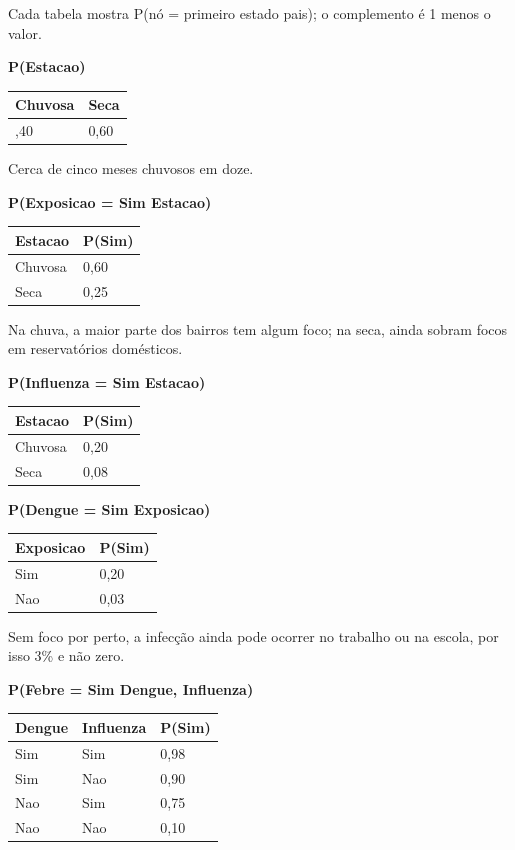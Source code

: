 \documentclass[12pt, a4paper]{article}
\begin{document}
Cada tabela mostra P(nó = primeiro estado \textbar{} pais); o complemento é 1 menos o valor.

\textbf{P(Estacao)}

\begin{longtable}{@{}ll@{}}
\toprule\noalign{}
Chuvosa & Seca \\
\midrule\noalign{}
\endhead
\bottomrule\noalign{}
\endlastfoot
0,40 & 0,60 \\
\end{longtable}

Cerca de cinco meses chuvosos em doze.

\textbf{P(Exposicao = Sim \textbar{} Estacao)}

\begin{longtable}{@{}ll@{}}
\toprule\noalign{}
Estacao & P(Sim\allowbreak ) \\
\midrule\noalign{}
\endhead
\bottomrule\noalign{}
\endlastfoot
Chuvosa & 0,60 \\
Seca & 0,25 \\
\end{longtable}

Na chuva, a maior parte dos bairros tem algum foco; na seca, ainda sobram focos em reservatórios domésticos.

\textbf{P(Influenza = Sim \textbar{} Estacao)}

\begin{longtable}{@{}ll@{}}
\toprule\noalign{}
Estacao & P(Sim\allowbreak ) \\
\midrule\noalign{}
\endhead
\bottomrule\noalign{}
\endlastfoot
Chuvosa & 0,20 \\
Seca & 0,08 \\
\end{longtable}

\textbf{P(Dengue = Sim \textbar{} Exposicao)}

\begin{longtable}{@{}ll@{}}
\toprule\noalign{}
Exposicao & P(Sim\allowbreak ) \\
\midrule\noalign{}
\endhead
\bottomrule\noalign{}
\endlastfoot
Sim & 0,20 \\
Nao & 0,03 \\
\end{longtable}

Sem foco por perto, a infecção ainda pode ocorrer no trabalho ou na escola, por isso 3\% e não zero.

\textbf{P(Febre = Sim \textbar{} Dengue, Influenza)}

\begin{longtable}{@{}lll@{}}
\toprule\noalign{}
Dengue & Influenza & P(Sim\allowbreak ) \\
\midrule\noalign{}
\endhead
\bottomrule\noalign{}
\endlastfoot
Sim & Sim & 0,98 \\
Sim & Nao & 0,90 \\
Nao & Sim & 0,75 \\
Nao & Nao & 0,10 \\
\end{longtable}
\end{document}
